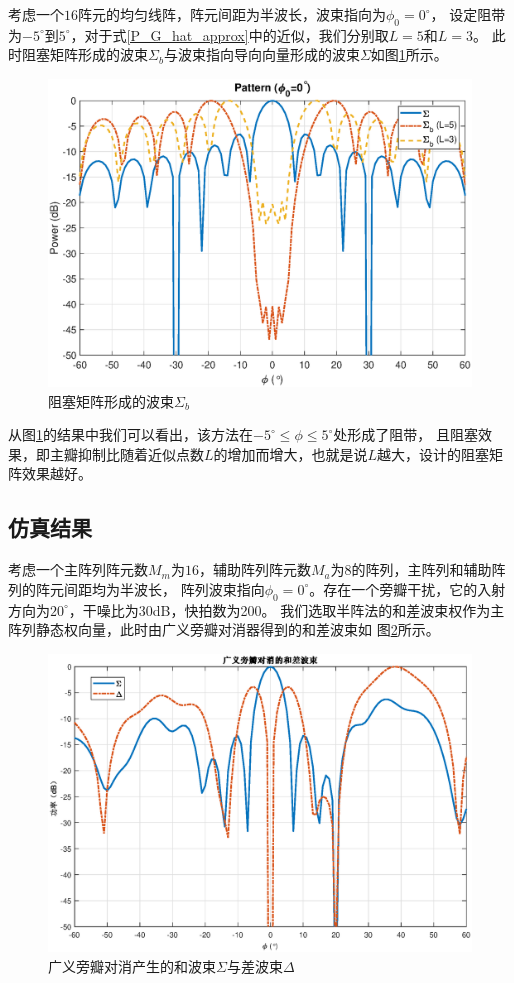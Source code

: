 \documentclass[master]{thesis-uestc}
\begin{document}
考虑一个$16$阵元的均匀线阵，阵元间距为半波长，波束指向为$\phi_0=0^\circ$，
设定阻带为$-5^\circ$到$5^\circ$，对于式\eqref{P_G_hat_approx}中的近似，我们分别取$L=5$和$L=3$。
此时阻塞矩阵形成的波束$\Sigma_b$与波束指向导向向量形成的波束$\Sigma$如图\ref{GSC_Block_dif_L}所示。
\begin{figure}[H]
    \includegraphics[scale=0.5]{pic/GSC_Block.eps}
    \caption{阻塞矩阵形成的波束$\Sigma_b$}
    \label{GSC_Block_dif_L}
\end{figure}

从图\ref{GSC_Block_dif_L}的结果中我们可以看出，该方法在$-5^\circ\le\phi\le5^\circ$处形成了阻带，
且阻塞效果，即主瓣抑制比随着近似点数$L$的增加而增大，也就是说$L$越大，设计的阻塞矩阵效果越好。

\subsection{仿真结果}
考虑一个主阵列阵元数$M_m$为$16$，辅助阵列阵元数$M_a$为$8$的阵列，主阵列和辅助阵列的阵元间距均为半波长，
阵列波束指向$\phi_0=0^\circ$。存在一个旁瓣干扰，它的入射方向为$20^\circ$，干噪比为30dB，快拍数为200。
我们选取半阵法的和差波束权作为主阵列静态权向量，此时由广义旁瓣对消器得到的和差波束如
图\ref{GSC_sigma_delta}所示。
\begin{figure}[H]
    \includegraphics[scale=0.5]{pic/GSC_sigma_delta.eps}
    \caption{广义旁瓣对消产生的和波束$\Sigma$与差波束$\Delta$}
    \label{GSC_sigma_delta}
\end{figure}
\end{document}
